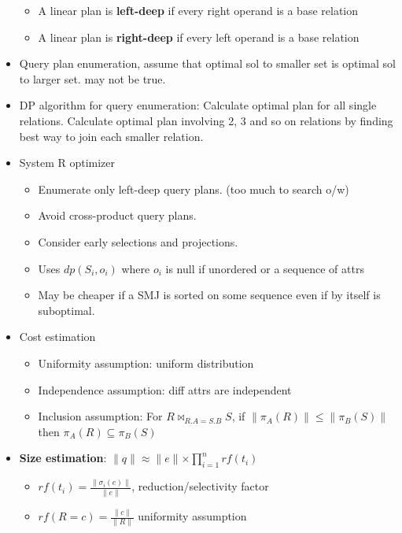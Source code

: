 \documentclass[8pt, landscape]{extarticle}
\begin{document}
\begin{multicols*}{4}
\begin{itemize}
\begin{itemize}
        \item A linear plan is \textbf{left-deep} if every right operand is a base relation
        \item A linear plan is \textbf{right-deep} if every left operand is a base relation
      \end{itemize}  
      \item Query plan enumeration, assume that optimal sol to smaller set is optimal sol to larger set. may not be true.
      \item DP algorithm for query enumeration: Calculate optimal plan for all single relations. Calculate optimal plan involving 2, 3 and so on relations by finding best way to join each smaller relation.
      \item System R optimizer
      \begin{itemize}
        \item Enumerate only left-deep query plans. (too much to search o/w)
        \item Avoid cross-product query plans.
        \item Consider early selections and projections.
        \item Uses $dp(S_i, o_i)$ where $o_i$ is null if unordered or a sequence of attrs
        \item May be cheaper if a SMJ is sorted on some sequence even if by itself is suboptimal. 
      \end{itemize}
      \item Cost estimation
      \begin{itemize}
        \item Uniformity assumption: uniform distribution
        \item Independence assumption: diff attrs are independent
        \item Inclusion assumption: For $R \bowtie_{R.A = S.B} S$, if $\lVert{\pi_A (R)}\lVert \leq \lVert{\pi_B (S)}\lVert$ then $\pi_A (R) \subseteq \pi_B(S)$
      \end{itemize}
      \item \textbf{Size estimation}: $\lVert q \lVert \approx \lVert e \lVert \times \prod_{i=1}^{n}rf(t_i)$
      \begin{itemize}
        \item $rf(t_i) = \frac{\lVert \sigma_i(e)\lVert}{\lVert e \lVert}$, reduction/selectivity factor
        \item $rf(R=c) = \frac{\lVert c \lVert}{\lVert R \lVert}$ uniformity assumption
      \end{itemize}

\end{itemize}
\end{multicols*}
\end{document}
